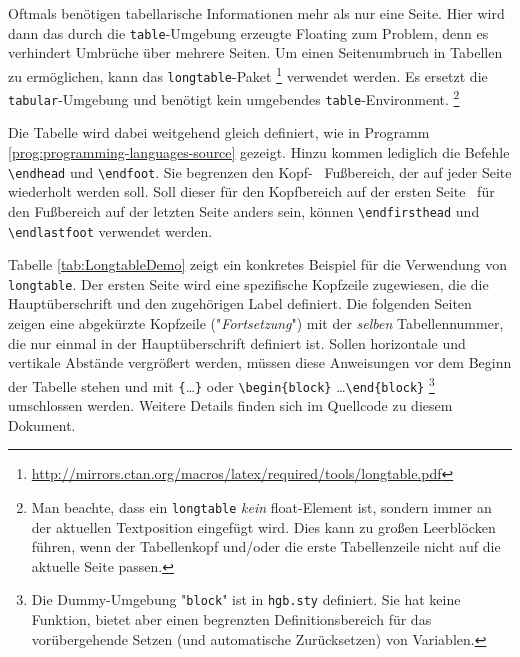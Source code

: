 Oftmals benötigen tabellarische Informationen mehr als nur eine Seite. Hier
wird dann das durch die \texttt{table}-Umgebung erzeugte Floating zum
Problem, denn es verhindert Umbrüche über mehrere Seiten. Um einen
Seitenumbruch in Tabellen zu ermöglichen, kann das \texttt{longtable}-Paket%
\footnote{%
\url{http://mirrors.ctan.org/macros/latex/required/tools/longtable.pdf}}
verwendet werden. Es ersetzt die \texttt{tabular}-Umgebung und benötigt kein
umgebendes \texttt{table}-Environment.%
\footnote{Man beachte, dass ein \texttt{longtable} \emph{kein} float-Element 
ist, sondern immer an der aktuellen Textposition eingefügt wird. Dies kann 
zu großen Leerblöcken führen, wenn der Tabellenkopf und/oder die erste
Tabellenzeile nicht auf die aktuelle Seite passen.}

Die Tabelle wird dabei weitgehend gleich definiert, wie in Programm
\ref{prog:programming-languages-source} gezeigt. Hinzu kommen lediglich die
Befehle \verb|\endhead| und \verb|\endfoot|. Sie begrenzen den Kopf- \bzw\
Fußbereich, der auf jeder Seite wiederholt werden soll. Soll dieser für den
Kopfbereich auf der ersten Seite \bzw\ für den Fußbereich auf der letzten
Seite anders sein, können \verb|\endfirsthead| und \verb|\endlastfoot|
verwendet werden.


Tabelle \ref{tab:LongtableDemo} zeigt ein konkretes Beispiel für die Verwendung
von \texttt{longtable}. Der ersten Seite wird eine spezifische Kopfzeile 
zugewiesen, die die Hauptüberschrift und den zugehörigen Label definiert. 
Die folgenden Seiten zeigen eine abgekürzte Kopfzeile ("\emph{Fortsetzung}")
mit der \emph{selben} Tabellennummer, die nur einmal in der Hauptüberschrift
definiert ist. Sollen horizontale und vertikale Abstände vergrößert werden,
müssen diese Anweisungen vor dem Beginn der Tabelle stehen und mit 
\verb|{|\ldots\verb|}| oder \verb|\begin{block}| \ldots \verb|\end{block}|%
\footnote{Die Dummy-Umgebung "\texttt{block}" ist in \texttt{hgb.sty} 
definiert. Sie hat keine Funktion, bietet aber einen begrenzten 
Definitionsbereich für das vorübergehende Setzen (und automatische Zurücksetzen)
von \latex\-Variablen.}
umschlossen werden. Weitere Details finden sich im Quellcode zu diesem Dokument.


